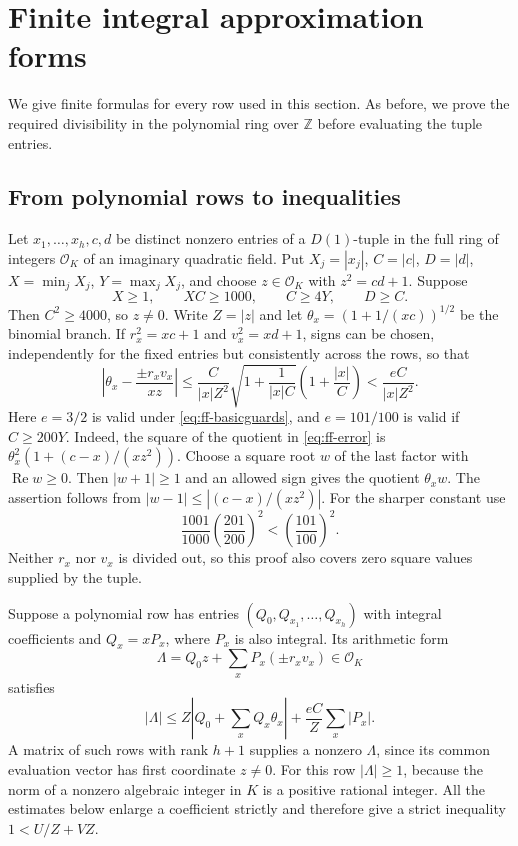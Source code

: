 \documentclass[12pt]{article}
\numberwithin{equation}{section}
\begin{document}
\section{Finite integral approximation forms}\label{sec:finiteforms}

We give finite formulas for every row used in this section. As before, we prove the required divisibility in the polynomial ring over $\mathbb Z$ before evaluating the tuple entries.

\subsection{From polynomial rows to inequalities}

Let $x_1,\ldots,x_h,c,d$ be distinct nonzero entries of a $D(1)$-tuple
in the full ring of integers $\mathcal O_K$ of an imaginary quadratic
field. Put $X_j=|x_j|$, $C=|c|$, $D=|d|$,
$X=\min_jX_j$, $Y=\max_jX_j$, and choose $z\in\mathcal O_K$ with
$z^2=cd+1$. Suppose
\begin{equation}\label{eq:ff-basicguards}
 X\ge1,\qquad XC\ge1000,\qquad C\ge4Y,\qquad D\ge C.
\end{equation}
Then $C^2\ge4000$, so $z\ne0$. Write $Z=|z|$ and let
$\theta_x=(1+1/(xc))^{1/2}$ be the binomial branch.
If $r_x^2=xc+1$ and $v_x^2=xd+1$, signs can be chosen, independently
for the fixed entries but consistently across the rows, so that
\begin{equation}\label{eq:ff-error}
 \left|\theta_x-\frac{\pm r_xv_x}{xz}\right|
 \le \frac{C}{|x|Z^2}
       \sqrt{1+\frac1{|x|C}}\left(1+\frac{|x|}{C}\right)
 <\frac{eC}{|x|Z^2}.
\end{equation}
Here $e=3/2$ is valid under \eqref{eq:ff-basicguards}, and $e=101/100$
is valid if $C\ge200Y$. Indeed, the square of the quotient in
\eqref{eq:ff-error} is
$\theta_x^2(1+(c-x)/(xz^2))$.
Choose a square root $w$ of the last factor with $\operatorname{Re}w\ge0$.
Then $|w+1|\ge1$ and an allowed sign gives the quotient $\theta_xw$.
The assertion follows from $|w-1|\le|(c-x)/(xz^2)|$. For the sharper constant use
\[
 \frac{1001}{1000}\left(\frac{201}{200}\right)^2
 <\left(\frac{101}{100}\right)^2.
\]
Neither $r_x$ nor $v_x$ is divided out, so this proof also covers zero
square values supplied by the tuple.

Suppose a polynomial row has entries $(Q_0,Q_{x_1},\ldots,Q_{x_h})$
with integral coefficients and $Q_x=xP_x$, where $P_x$ is also integral.
Its arithmetic form
\[
 \Lambda=Q_0z+\sum_xP_x(\pm r_xv_x)\in\mathcal O_K
\]
satisfies
\begin{equation}\label{eq:ff-master}
 |\Lambda|\le Z\left|Q_0+\sum_xQ_x\theta_x\right|
                 +\frac{eC}{Z}\sum_x|P_x|.
\end{equation}
A matrix of such rows with rank $h+1$ supplies a nonzero $\Lambda$,
since its common evaluation vector has first coordinate $z\ne0$.
For this row $|\Lambda|\ge1$, because the norm of a nonzero algebraic
integer in $K$ is a positive rational integer. All the estimates below
enlarge a coefficient strictly and therefore give a strict inequality
$1<U/Z+VZ$.
\end{document}
